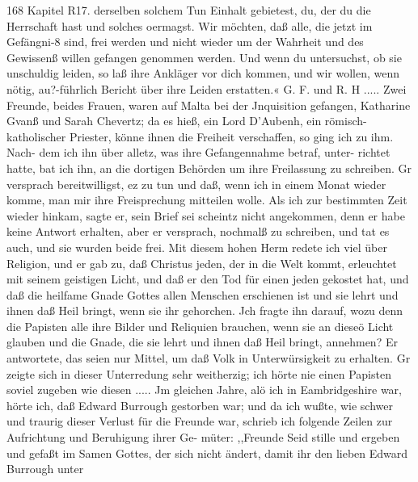 168 Kapitel R17.
derselben solchem Tun Einhalt gebietest, du, der du die Herrschaft
hast und solches oermagst. Wir möchten, daß alle, die jetzt im
Gefängni-8 sind, frei werden und nicht wieder um der Wahrheit
und des Gewissenß willen gefangen genommen werden. Und wenn
du untersuchst, ob sie unschuldig leiden, so laß ihre Ankläger vor
dich kommen, und wir wollen, wenn nötig, au?-führlich Bericht
über ihre Leiden erstatten.« G. F. und R. H .....
Zwei Freunde, beides Frauen, waren auf Malta bei der
Jnquisition gefangen, Katharine Gvanß und Sarah Chevertz; da
es hieß, ein Lord D'Aubenh, ein römisch-katholischer Priester,
könne ihnen die Freiheit verschaffen, so ging ich zu ihm. Nach-
dem ich ihn über alletz, was ihre Gefangennahme betraf, unter-
richtet hatte, bat ich ihn, an die dortigen Behörden um ihre
Freilassung zu schreiben. Gr versprach bereitwilligst, ez zu tun
und daß, wenn ich in einem Monat wieder komme, man mir
ihre Freisprechung mitteilen wolle. Als ich zur bestimmten Zeit
wieder hinkam, sagte er, sein Brief sei scheintz nicht angekommen,
denn er habe keine Antwort erhalten, aber er versprach, nochmalß
zu schreiben, und tat es auch, und sie wurden beide frei.
Mit diesem hohen Herm redete ich viel über Religion, und
er gab zu, daß Christus jeden, der in die Welt kommt, erleuchtet
mit seinem geistigen Licht, und daß er den Tod für einen jeden
gekostet hat, und daß die heilfame Gnade Gottes allen Menschen
erschienen ist und sie lehrt und ihnen daß Heil bringt, wenn sie
ihr gehorchen. Jch fragte ihn darauf, wozu denn die Papisten
alle ihre Bilder und Reliquien brauchen, wenn sie an dieseö Licht
glauben und die Gnade, die sie lehrt und ihnen daß Heil bringt,
annehmen? Er antwortete, das seien nur Mittel, um daß
Volk in Unterwürsigkeit zu erhalten. Gr zeigte sich in dieser
Unterredung sehr weitherzig; ich hörte nie einen Papisten soviel
zugeben wie diesen .....
Jm gleichen Jahre, alö ich in Eambridgeshire war, hörte ich,
daß Edward Burrough gestorben war; und da ich wußte, wie
schwer und traurig dieser Verlust für die Freunde war, schrieb
ich folgende Zeilen zur Aufrichtung und Beruhigung ihrer Ge-
müter:
,,Freunde
Seid stille und ergeben und gefaßt im Samen Gottes, der
sich nicht ändert, damit ihr den lieben Edward Burrough unter



